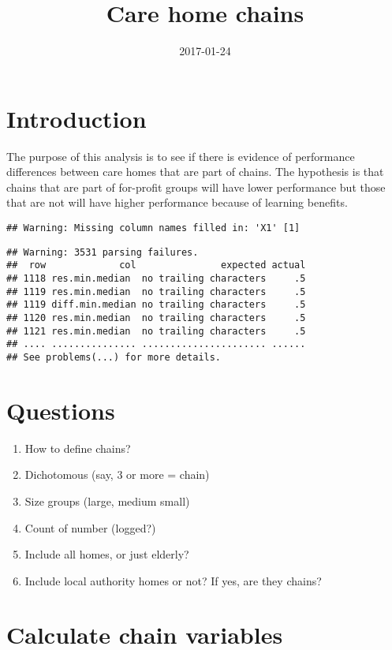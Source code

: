 \documentclass[]{article}
\title{Care home chains}
\author{}
\date{2017-01-24}
\providecommand{\tightlist}{%
  \setlength{\itemsep}{0pt}\setlength{\parskip}{0pt}}
\begin{document}
\maketitle

\section{Introduction}\label{introduction}

The purpose of this analysis is to see if there is evidence of
performance differences between care homes that are part of chains. The
hypothesis is that chains that are part of for-profit groups will have
lower performance but those that are not will have higher performance
because of learning benefits.

\begin{verbatim}
## Warning: Missing column names filled in: 'X1' [1]
\end{verbatim}

\begin{verbatim}
## Warning: 3531 parsing failures.
##  row             col               expected actual
## 1118 res.min.median  no trailing characters     .5
## 1119 res.min.median  no trailing characters     .5
## 1119 diff.min.median no trailing characters     .5
## 1120 res.min.median  no trailing characters     .5
## 1121 res.min.median  no trailing characters     .5
## .... ............... ...................... ......
## See problems(...) for more details.
\end{verbatim}

\section{Questions}\label{questions}

\begin{enumerate}
\def\labelenumi{\arabic{enumi}.}
\tightlist
\item
  How to define chains?
\item
  Dichotomous (say, 3 or more = chain)
\item
  Size groups (large, medium small)
\item
  Count of number (logged?)
\item
  Include all homes, or just elderly?
\item
  Include local authority homes or not? If yes, are they chains?
\end{enumerate}

\section{Calculate chain variables}\label{calculate-chain-variables}
\end{document}
